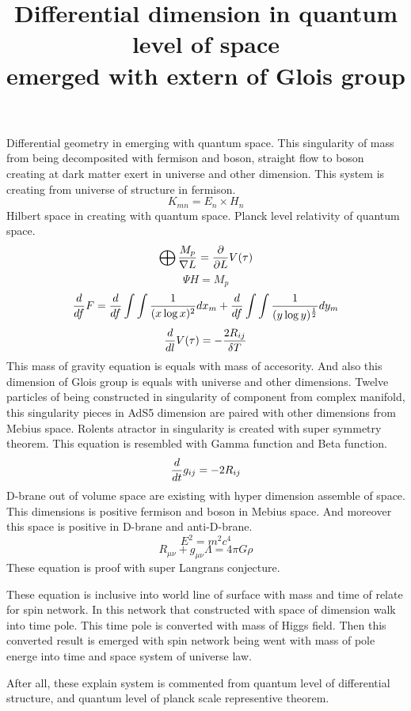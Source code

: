 \documentclass{jsarticle}
\begin{document}
\title{Differential dimension in quantum level of space \\
       emerged with extern of Glois group}
\author{}
\date{}
\maketitle
  Differential geometry in emerging with quantum space.
  This singularity of mass from being decomposited with fermison and boson,
  straight flow to boson creating at dark matter exert in universe and other dimension.
  This system is creating from universe of structure in fermison.
  $$ K_{mn} = E_n \times H_n $$
  Hilbert space in creating with quantum space.
  Planck level relativity of quantum space.
  $$ \bigoplus {M_p \over \nabla L} = {\partial \over \partial L} V(\tau) $$
  $$ \Psi H = M_p $$
  $$ {d \over df} F = {d \over df}\int \int {1 \over (x \log x)^2}dx_m 
     + {d \over df} \int \int {1 \over (y \log y)^{1 \over 2}}dy_m $$
  $$ {d \over d l} V(\tau) = - {2 R_{ij} \over \delta T} $$
  This mass of gravity equation is equals with mass of accesority.
  And also this dimension of Glois group is equals with universe and other
  dimensions.
  Twelve particles of being constructed in singularity of component from complex manifold, 
  this singularity pieces in AdS5 dimension are paired with other dimensions from Mebius space.
  Rolents atractor in singularity is created with super symmetry theorem.
  This equation is resembled with Gamma function and Beta function.
  $$ {d \over dt}g_{ij} = - 2 R_{ij} $$
  D-brane out of volume space are existing with hyper dimension assemble of space.
  This dimensions is positive fermison and boson in Mebius space.
  And moreover this space is positive in D-brane and anti-D-brane.
  $$ E^2 = m^2 c^4 $$
  $$ R_{\mu\nu} + g_{\mu\nu} \Lambda = 4 \pi G \rho $$ 
  These equation is proof with super Langrans conjecture.
  

  These equation is inclusive into world line of surface with mass and
  time of relate for spin network. In this network that constructed with
  space of dimension walk into time pole. This time pole is converted with
  mass of Higgs field. Then this converted result is emerged with 
  spin network being went with mass of pole energe into time and space
  system of universe law.

  After all, these explain system is commented from quantum level of
  differential structure, and quantum level of planck scale representive 
  theorem.
\end{document}
